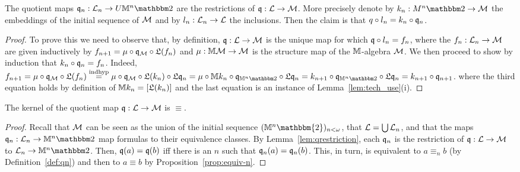 \documentclass{book}
\begin{document}
\begin{lemma}\label{lem:qrestriction}
    The quotient maps $\xxviquo_n: \xxviLang_n \to U \xxviM^n \xxvibbtwo$ 
    are the restrictions of $\mathfrak{q}:\mathcal{L} \to \mathcal{M}$. More precisely 
    denote  by $k_n:M^n\xxvibbtwo\to\xxviLTM$ the embeddings of the initial 	
    sequence of $\mathcal{M}$ and by $l_n:\mathcal{L}_n\to\mathcal{L}$ the inclusions. 
    Then the claim is that $q\circ l_n=k_n\circ\mathfrak{q}_n$. 
\end{lemma}
\xxviproofspace
\begin{proof}    
  To prove this we need to observe that, by definition,
  $\mathfrak{q}:\mathcal{L}\to\mathcal{M}$ is the unique map for which $\mathfrak{q}\circ l_n=f_n$,
  where the $f_n:\mathcal{L}_n\to\mathcal{M}$ are given inductively by
  $f_{n+1}=\mu\circ\mathfrak{q}_{\mathcal{M}}\circ\mathfrak{L}(f_n)$ and $\mu:\mathbb{M}\mathcal{M}\to\mathcal{M}$
  is the structure map of the $\mathbb{M}$-algebra $\mathcal{M}$. We then proceed to
  show by induction that $k_n\circ\mathfrak{q}_n=f_n$. Indeed,
%
$f_{n+1} = %
\mu\circ\xxviquo_\xxviLTM\circ\xxviLift(f_n) \stackrel{\tiny\mathrm{ind hyp}}{=} %
\mu\circ\xxviquo_\xxviLTM\circ\xxviLift(k_n)\circ\xxviLift{\xxviquo_n} = %
\mu\circ\xxviM k_n\circ \xxviquo_{\xxviM^n\xxvibbtwo}\circ\xxviLift{\xxviquo_n} = %
k_{n+1} \circ \xxviquo_{\xxviM^n\xxvibbtwo}\circ\xxviLift{\xxviquo_n} = %
k_{n+1} \circ \xxviquo_{n+1}$. 
where the third equation holds by definition of $\mathbb{M} k_n =
[\mathfrak{L}(k_n)]$ and the last equation is an instance of
Lemma~\ref{lem:tech_use}(i).
\end{proof}

\begin{proposition}\label{prop:Lang-M}
The kernel of the quotient map $\mathfrak{q}:\mathcal{L}\to\mathcal{M}$ is $\equiv$.
\end{proposition}
\xxviproofspace
\begin{proof}
Recall that $\mathcal{M}$ can be seen as the union of the initial sequence 
$(\xxviM^n\mathbbm{2})_{n<\omega}$, that $\mathcal{L}=\bigcup\mathcal{L}_n$, and that
the maps $\xxviquo_n:\xxviLang_n\to\xxviM^n\xxvibbtwo$ map formulas to their equivalence
classes. By Lemma~\ref{lem:qrestriction}, each $\mathfrak{q}_n$ is the restriction
of $\mathfrak{q}:\mathcal{L}\to\mathcal{M}$ to $\xxviLang_n\to\xxviM^n\xxvibbtwo$.
Then, $\mathfrak{q}(a) = \mathfrak{q}(b)$ iff there is an $n$ such that $\mathfrak{q}_n(a)=\mathfrak{q}_n(b)$.
This, in turn, is equivalent to $a\equiv_n b$ (by Definition~\ref{def:qn})
and then to $a\equiv b$ by Proposition~\ref{prop:equiv-n}. 
\end{proof}
\end{document}
